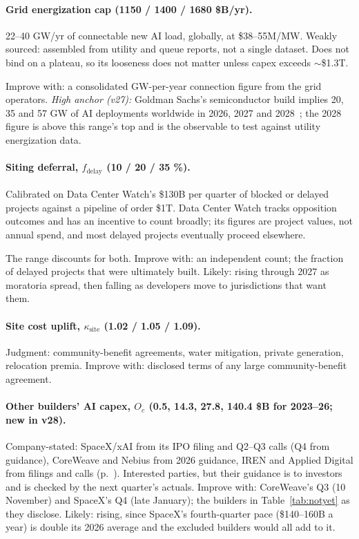 \documentclass[11pt,letterpaper]{article}
\begin{document}
\paragraph{Grid energization cap (1150 / 1400 / 1680 \$B/yr).} 22--40 GW/yr of connectable new AI load, globally, at \$38--55M/MW. Weakly sourced: assembled from utility and queue reports, not a single dataset. Does not bind on a plateau, so its looseness does not matter unless capex exceeds $\sim$\$1.3T.

Improve with: a consolidated GW-per-year connection figure from the grid operators. \emph{High anchor (v27):} Goldman Sachs's semiconductor build implies 20, 35 and 57 GW of AI deployments worldwide in 2026, 2027 and 2028~\cite{ref:gs_roic2026}; the 2028 figure is above this range's top and is the observable to test against utility energization data.

\paragraph{Siting deferral, $f_{\text{delay}}$ (10 / 20 / 35 \%).} Calibrated on Data Center Watch's \$130B per quarter of blocked or delayed projects against a pipeline of order \$1T. Data Center Watch tracks opposition outcomes and has an incentive to count broadly; its figures are project values, not annual spend, and most delayed projects eventually proceed elsewhere.

The range discounts for both. Improve with: an independent count; the fraction of delayed projects that were ultimately built. Likely: rising through 2027 as moratoria spread, then falling as developers move to jurisdictions that want them.

\paragraph{Site cost uplift, $\kappa_{\text{site}}$ (1.02 / 1.05 / 1.09).} Judgment: community-benefit agreements, water mitigation, private generation, relocation premia. Improve with: disclosed terms of any large community-benefit agreement.

\paragraph{Other builders' AI capex, $O_c$ (0.5, 14.3, 27.8, 140.4 \$B for 2023--26; new in v28).} Company-stated: SpaceX/xAI from its IPO filing and Q2--Q3 calls (Q4 from guidance), CoreWeave and Nebius from 2026 guidance, IREN and Applied Digital from filings and calls (p.~\pageref{ag:spacex}). Interested parties, but their guidance is to investors and is checked by the next quarter's actuals. Improve with: CoreWeave's Q3 (10 November) and SpaceX's Q4 (late January); the builders in Table~\ref{tab:notyet} as they disclose. Likely: rising, since SpaceX's fourth-quarter pace (\$140--160B a year) is double its 2026 average and the excluded builders would all add to it.
\end{document}
